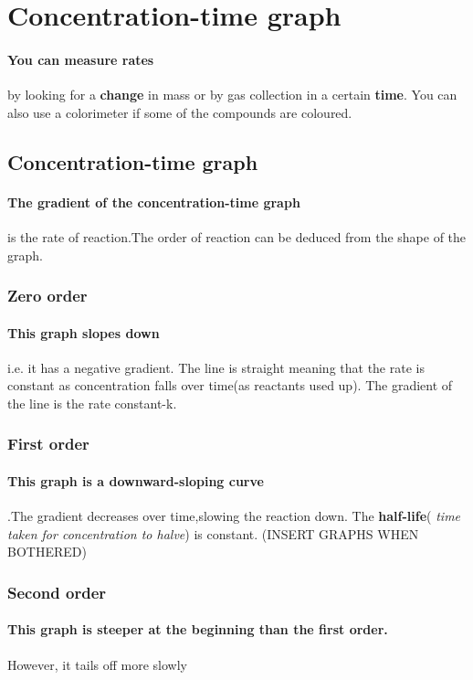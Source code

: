 \section{Concentration-time graph}
\paragraph{You can measure rates}by looking for a \textbf{change} in mass or by gas collection in a certain \textbf{time}. You can also use a colorimeter if some of the compounds are coloured.
\subsection{Concentration-time graph}
\paragraph{The gradient of the concentration-time graph} is the rate of reaction.The order of reaction can be deduced from the shape of the graph.
\subsubsection{Zero order}
\paragraph{This graph slopes down}i.e. it has a negative gradient. The line is straight meaning that the rate is constant as concentration falls over time(as reactants used up). The gradient of the line is the rate constant-k.
\subsubsection{First order}
\paragraph{This graph is a downward-sloping curve}.The gradient decreases over time,slowing the reaction down. The \textbf{half-life}( \textit{time taken for concentration to halve}) is constant.
(INSERT GRAPHS WHEN BOTHERED)
\subsubsection{Second order}
\paragraph{This graph is steeper at the beginning than the first order.}However, it tails off more slowly
